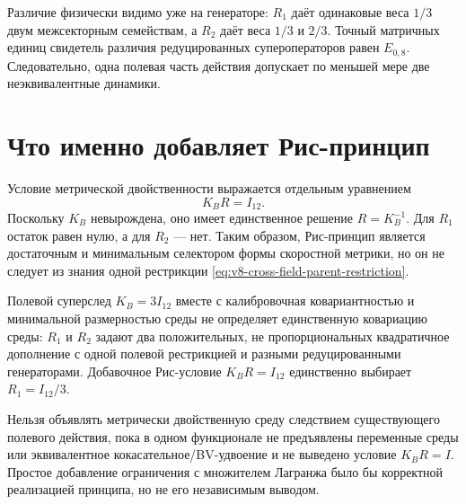 Различие физически видимо уже на генераторе: $R_1$ даёт одинаковые веса
$1/3$ двум межсекторным семействам, а $R_2$ даёт веса $1/3$ и $2/3$. Точный
матричных единиц свидетель различия редуцированных супероператоров равен
$E_{0,8}$. Следовательно, одна полевая часть действия допускает по меньшей
мере две неэквивалентные динамики.

\section{Что именно добавляет Рис-принцип}

Условие метрической двойственности выражается отдельным уравнением
\begin{equation}
 K_BR=I_{12}.
 \label{eq:v8-riesz-reciprocity-condition}
\end{equation}
Поскольку $K_B$ невырождена, оно имеет единственное решение
$R=K_B^{-1}$. Для $R_1$ остаток равен нулю, а для $R_2$ --- нет. Таким
образом, Рис-принцип является достаточным и минимальным селектором формы
скоростной метрики, но он не следует из знания одной рестрикции
\eqref{eq:v8-cross-field-parent-restriction}.

\begin{theorem}
Полевой суперслед $K_B=3I_{12}$ вместе с калибровочная ковариантностью и
минимальной размерностью среды не определяет единственную ковариацию среды:
$R_1$ и $R_2$ задают два положительных, не пропорциональных квадратичное дополнение с
одной полевой рестрикцией и разными редуцированными генераторами. Добавочное
Рис-условие $K_BR=I_{12}$ единственно выбирает $R_1=I_{12}/3$.
\end{theorem}

\begin{nogocriterion}
Нельзя объявлять метрически двойственную среду следствием существующего
полевого действия, пока в одном функционале не предъявлены переменные среды
или эквивалентное кокасательное/BV-удвоение и не выведено условие $K_BR=I$.
Простое добавление ограничения с множителем Лагранжа было бы корректной
реализацией принципа, но не его независимым выводом.
\end{nogocriterion}

